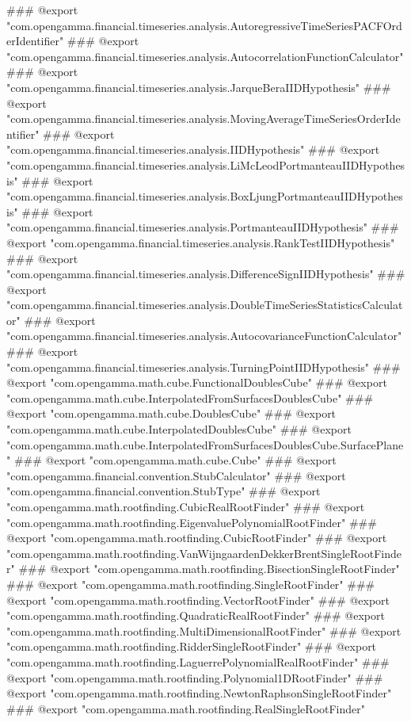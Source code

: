 ### @export "com.opengamma.financial.timeseries.analysis.AutoregressiveTimeSeriesPACFOrderIdentifier"
### @export "com.opengamma.financial.timeseries.analysis.AutocorrelationFunctionCalculator"
### @export "com.opengamma.financial.timeseries.analysis.JarqueBeraIIDHypothesis"
### @export "com.opengamma.financial.timeseries.analysis.MovingAverageTimeSeriesOrderIdentifier"
### @export "com.opengamma.financial.timeseries.analysis.IIDHypothesis"
### @export "com.opengamma.financial.timeseries.analysis.LiMcLeodPortmanteauIIDHypothesis"
### @export "com.opengamma.financial.timeseries.analysis.BoxLjungPortmanteauIIDHypothesis"
### @export "com.opengamma.financial.timeseries.analysis.PortmanteauIIDHypothesis"
### @export "com.opengamma.financial.timeseries.analysis.RankTestIIDHypothesis"
### @export "com.opengamma.financial.timeseries.analysis.DifferenceSignIIDHypothesis"
### @export "com.opengamma.financial.timeseries.analysis.DoubleTimeSeriesStatisticsCalculator"
### @export "com.opengamma.financial.timeseries.analysis.AutocovarianceFunctionCalculator"
### @export "com.opengamma.financial.timeseries.analysis.TurningPointIIDHypothesis"
### @export "com.opengamma.math.cube.FunctionalDoublesCube"
### @export "com.opengamma.math.cube.InterpolatedFromSurfacesDoublesCube"
### @export "com.opengamma.math.cube.DoublesCube"
### @export "com.opengamma.math.cube.InterpolatedDoublesCube"
### @export "com.opengamma.math.cube.InterpolatedFromSurfacesDoublesCube.SurfacePlane"
### @export "com.opengamma.math.cube.Cube"
### @export "com.opengamma.financial.convention.StubCalculator"
### @export "com.opengamma.financial.convention.StubType"
### @export "com.opengamma.math.rootfinding.CubicRealRootFinder"
### @export "com.opengamma.math.rootfinding.EigenvaluePolynomialRootFinder"
### @export "com.opengamma.math.rootfinding.CubicRootFinder"
### @export "com.opengamma.math.rootfinding.VanWijngaardenDekkerBrentSingleRootFinder"
### @export "com.opengamma.math.rootfinding.BisectionSingleRootFinder"
### @export "com.opengamma.math.rootfinding.SingleRootFinder"
### @export "com.opengamma.math.rootfinding.VectorRootFinder"
### @export "com.opengamma.math.rootfinding.QuadraticRealRootFinder"
### @export "com.opengamma.math.rootfinding.MultiDimensionalRootFinder"
### @export "com.opengamma.math.rootfinding.RidderSingleRootFinder"
### @export "com.opengamma.math.rootfinding.LaguerrePolynomialRealRootFinder"
### @export "com.opengamma.math.rootfinding.Polynomial1DRootFinder"
### @export "com.opengamma.math.rootfinding.NewtonRaphsonSingleRootFinder"
### @export "com.opengamma.math.rootfinding.RealSingleRootFinder"
